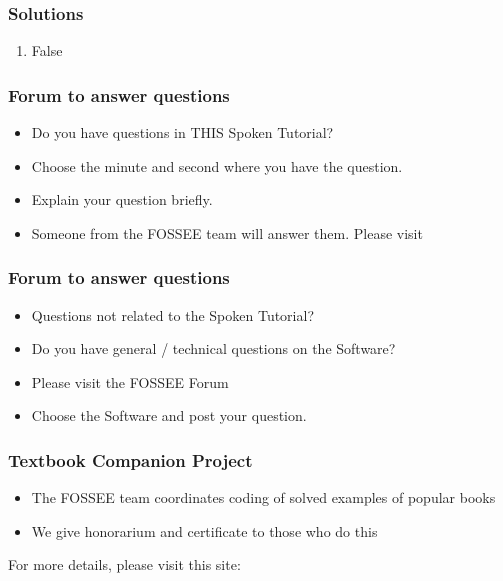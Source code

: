 \documentclass[17pt]{beamer}
\begin{document}
\begin{frame}
\frametitle{Solutions}
\label{sec-22}
\begin{enumerate}
\item False\pause
\end{enumerate}
\end{frame}
\begin{frame}
\frametitle{Forum to answer questions}
\begin{itemize}
\item Do you have questions in THIS Spoken Tutorial?
\item Choose the minute and second where you have the question.
\item Explain your question briefly.
\item Someone from the FOSSEE team will answer them. Please visit 
\end{itemize}
\begin{center}
{\color{blue}{http://forums.spoken-tutorial.org/}}
 \end{center} 
\end{frame}
\begin{frame}
\frametitle{Forum to answer questions}
\begin{itemize}
\item Questions not related to the Spoken Tutorial?
\item Do you have general / technical questions on the Software?
\item Please visit the FOSSEE Forum
\begin{center}
{\color{blue}{http://forums.fossee.in/}}
 \end{center}
\item Choose the Software and post your question.
\end{itemize}
\end{frame}
\begin{frame}
\frametitle{Textbook Companion Project}
\begin{itemize}
\item The FOSSEE team coordinates coding of solved examples of popular
  books 
\item We give honorarium and certificate to those who do this
\end{itemize}
For more details, please visit this site:
\begin{center}
{\color{blue}{http://tbc-python.fossee.in/}}
\end{center}
\end{frame}
\end{document}
